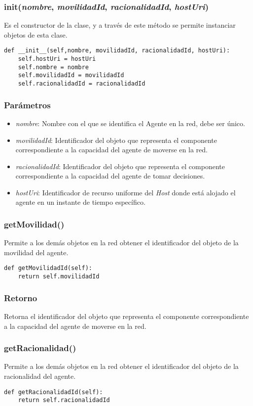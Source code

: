\documentclass{article}
\begin{document}
\subsubsection{\textbf{init}(\textit{nombre}, \textit{movilidadId}, \textit{racionalidadId}, \textit{hostUri})}
Es el constructor de la clase, y a través de este método se permite instanciar objetos de esta clase.
\begin{lstlisting}
def __init__(self,nombre, movilidadId, racionalidadId, hostUri):
	self.hostUri = hostUri
	self.nombre = nombre
	self.movilidadId = movilidadId
	self.racionalidadId = racionalidadId
\end{lstlisting}
\subsubsection*{Parámetros}
\begin{itemize}
\item \textit{nombre}: Nombre con el que se identifica el Agente en la red, debe ser único.
\item \textit{movilidadId}: Identificador del objeto que representa el componente correspondiente a la capacidad del agente de moverse en la red.
\item \textit{racionalidadId}: Identificador del objeto que representa el componente correspondiente a la capacidad del agente de tomar decisiones.
\item \textit{hostUri}: Identificador de recurso uniforme del \textit{Host} donde está alojado el agente en un instante de tiempo específico.
\end{itemize}
\subsubsection{\textbf{getMovilidad}()}
Permite a los demás objetos en la red obtener el identificador del objeto de la movilidad del agente.
\begin{lstlisting}
def getMovilidadId(self):
	return self.movilidadId
\end{lstlisting}
\subsubsection*{Retorno}
Retorna el identificador del objeto que representa el componente correspondiente a la capacidad del agente de moverse en la red.
\subsubsection{\textbf{getRacionalidad}()}
Permite a los demás objetos en la red obtener el identificador del objeto de la racionalidad del agente.
\begin{lstlisting}
def getRacionalidadId(self):
	return self.racionalidadId
\end{lstlisting}
\end{document}
